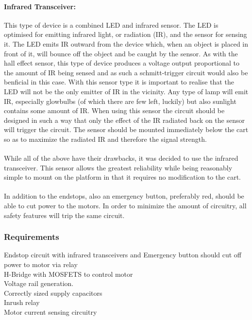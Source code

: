 \paragraph{Infrared Transceiver:} %
\label{par:infrared_transceiver}
This type of device is a combined LED and infrared sensor.
The LED is optimised for emitting infrared light, or radiation (IR), and the sensor for sensing it.
The LED emits IR outward from the device which, when an object is placed in front of it, will bounce off the object and be caught by the sensor.
As with the hall effect sensor, this type of device produces a voltage output proportional to the amount of IR being sensed and as such a schmitt-trigger circuit would also be benficial in this case.
With this sensor type it is important to realise that the LED will not be the only emitter of IR in the vicinity.
Any type of lamp will emit IR, especially glowbulbs (of which there are few left, luckily) but also sunlight contains some amount of IR.
When using this sensor the circuit should be designed in such a way that only the effect of the IR radiated back on the sensor will trigger the circuit.
The sensor should be mounted immediately below the cart so as to maximize the radiated IR and therefore the signal strength.
\\~\\
While all of the above have their drawbacks, it was decided to use the infrared transceiver.
This sensor allows the greatest reliability while being reasonably simple to mount on the platform in that it requires no modification to the cart.
\\~\\
In addition to the endstops, also an emergency button, preferably red, should be able to cut power to the motors.
In order to minimize the amount of circuitry, all safety features will trip the same circuit.



\subsubsection{Requirements}

Endstop circuit with infrared transceivers and Emergency button should cut off power to motor via relay
\\
H-Bridge with MOSFETS to control motor
\\
Voltage rail generation.
\\
Correctly sized supply capacitors
\\
Inrush relay
\\
Motor current sensing circuitry